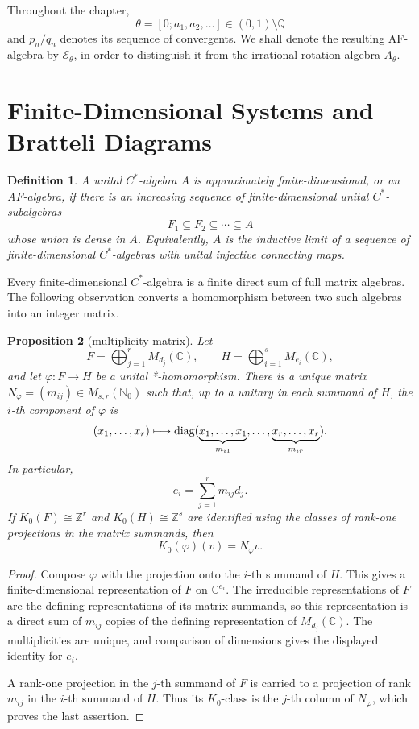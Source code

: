 \documentclass{book}
\newtheorem{definition}{Definition}[section]
\newtheorem{proposition}[definition]{Proposition}
\def\diag{\textnormal{diag}}
\begin{document}
Throughout the chapter,
\[
  \theta=[0;a_1,a_2,\ldots]\in(0,1)\setminus\mathbb Q
\]
and \(p_n/q_n\) denotes its sequence of convergents.  We shall denote the
resulting AF-algebra by \(\mathcal E_\theta\), in order to distinguish it
from the irrational rotation algebra \(A_\theta\).

\section{Finite-Dimensional Systems and Bratteli Diagrams}

\begin{definition}
  A unital \(C^*\)-algebra \(A\) is \textnormal{approximately
  finite-dimensional}, or an \textnormal{AF-algebra}, if there is an
  increasing sequence of finite-dimensional unital \(C^*\)-subalgebras
  \[
    F_1\subseteq F_2\subseteq\cdots\subseteq A
  \]
  whose union is dense in \(A\).  Equivalently, \(A\) is the inductive
  limit of a sequence of finite-dimensional \(C^*\)-algebras with unital
  injective connecting maps.
\end{definition}

Every finite-dimensional \(C^*\)-algebra is a finite direct sum of full
matrix algebras.  The following observation converts a homomorphism between
two such algebras into an integer matrix.

\begin{proposition}[multiplicity matrix]\label{proposition:MultiplicityMatrix}
  Let
  \[
    F=\bigoplus_{j=1}^{r}M_{d_j}(\mathbb C),
    \qquad
    H=\bigoplus_{i=1}^{s}M_{e_i}(\mathbb C),
  \]
  and let \(\varphi\colon F\to H\) be a unital *-homomorphism.  There is a
  unique matrix \(N_\varphi=(m_{ij})\in M_{s,r}(\mathbb N_0)\) such that,
  up to a unitary in each summand of \(H\), the \(i\)-th component of
  \(\varphi\) is
  \[
    (x_1,\ldots,x_r)\longmapsto
    \diag(\underbrace{x_1,\ldots,x_1}_{m_{i1}},\ldots,
          \underbrace{x_r,\ldots,x_r}_{m_{ir}}).
  \]
  In particular,
  \[
    e_i=\sum_{j=1}^{r}m_{ij}d_j.
  \]
  If \(K_0(F)\cong\mathbb Z^r\) and
  \(K_0(H)\cong\mathbb Z^s\) are identified using the classes of
  rank-one projections in the matrix summands, then
  \[
    K_0(\varphi)(v)=N_\varphi v.
  \]
\end{proposition}

\begin{proof}
  Compose \(\varphi\) with the projection onto the \(i\)-th summand of
  \(H\).  This gives a finite-dimensional representation of \(F\) on
  \(\mathbb C^{e_i}\).  The irreducible representations of \(F\) are the
  defining representations of its matrix summands, so this representation
  is a direct sum of \(m_{ij}\) copies of the defining representation of
  \(M_{d_j}(\mathbb C)\).  The multiplicities are unique, and comparison of
  dimensions gives the displayed identity for \(e_i\).

  A rank-one projection in the \(j\)-th summand of \(F\) is carried to a
  projection of rank \(m_{ij}\) in the \(i\)-th summand of \(H\).  Thus its
  \(K_0\)-class is the \(j\)-th column of \(N_\varphi\), which proves the
  last assertion.
\end{proof}
\end{document}
